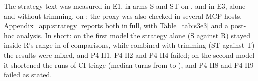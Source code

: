 The strategy text was measured in E1, in arms S and ST on \texttt{\SthreeModelA}, and in E3, alone and without
trimming, on \texttt{\SthreeModelB}; the proxy was also checked in several MCP hosts. Appendix~\ref{app:strategy}
reports both in full, with Table~\ref{tab:s3e3} and a post-hoc analysis. In short: on the first model the strategy
alone (S against R) stayed inside R's range in \SthreeEOneSinsideR{} of \SthreeEOneSinsideRof{} comparisons, while
combined with trimming (ST against T) the results were mixed, and P4-H1, P4-H2 and P4-H4 failed; on the second model
it shortened the runs of CI triage (median turns from \SthreeEThreeTurnsRv{} to \SthreeEThreeTurnsSv), and P4-H8
and P4-H9 failed as stated.

